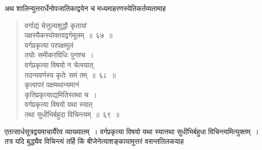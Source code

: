 \documentclass[11pt, openany]{book}
\begin{document}
\vspace{-3mm}
 अथ शालिन्युत्तरार्धेनोपजातिकाद्वयेन च मध्यमाहरणस्येतिकर्तव्यतामाह\textendash 
\begin{quote}
    \bs
 वर्गाद्यं चेत्तुल्यशुद्धौ कृतायां \\

\vspace{-7mm}
\hspace{1cm} पक्षस्यैकस्योक्तवद्वर्गमूलम्~॥~६७~॥~\\

 \vspace{-5mm}
 वर्गप्रकृत्या परपक्षमूलं \\

\vspace{-7mm}
\hspace{1cm} तयोः समीकरविधिः पुनश्च~। \\

\vspace{-7mm}
 वर्गप्रकृत्या विषयो न चेत्स्यात् \\

\vspace{-7mm}
\hspace{1cm} तदन्यवर्णस्य कृतेः समं तम्~॥~६८~॥~\\

\vspace{-5mm}
 कृत्वापरं पक्षमथान्यमानं \\

\vspace{-7mm}
\hspace{1cm} कृतिप्रकृत्याद्यमितिस्तथा च~। \\

\vspace{-7mm}
 वर्गप्रकृत्या विषयो यथा स्यात् \\

\vspace{-7mm}
\hspace{1cm} तथा सुधीभिर्बहुदा विचिन्त्यम्~॥~६९~॥~
\end{quote}

 एतत्सार्धसूत्रद्वयमाचार्यैरेव व्याख्यातम्~। वर्गप्रकृत्या विषयो यथा 
स्यात्तथा सुधीभिर्बहुधा विचिन्त्यमित्युक्तम्~। \\

\vspace{-3mm}
 तत्र यदि बुद्ध्यैव विचिन्त्यं तर्हि किं बीजेनेत्याशङ्कायामुत्तरं 
वसन्ततिलकयाह\textendash
\end{document}
